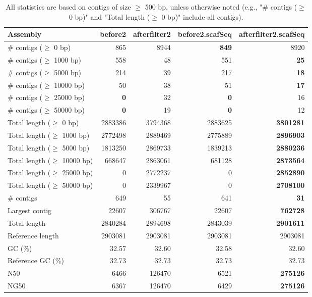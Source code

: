 \documentclass[12pt,a4paper]{article}
\begin{document}
\begin{table}[ht]
\begin{center}
\caption{All statistics are based on contigs of size $\geq$ 500 bp, unless otherwise noted (e.g., "\# contigs ($\geq$ 0 bp)" and "Total length ($\geq$ 0 bp)" include all contigs).}
\begin{tabular}{|l*{4}{|r}|}
\hline
Assembly & before2 & afterfilter2 & before2.scafSeq & afterfilter2.scafSeq \\ \hline
\# contigs ($\geq$ 0 bp) & 865 & 8944 & {\bf 849} & 8920 \\ \hline
\# contigs ($\geq$ 1000 bp) & 558 & 48 & 551 & {\bf 25} \\ \hline
\# contigs ($\geq$ 5000 bp) & 214 & 39 & 217 & {\bf 18} \\ \hline
\# contigs ($\geq$ 10000 bp) & 50 & 38 & 51 & {\bf 17} \\ \hline
\# contigs ($\geq$ 25000 bp) & {\bf 0} & 32 & {\bf 0} & 16 \\ \hline
\# contigs ($\geq$ 50000 bp) & {\bf 0} & 19 & {\bf 0} & 12 \\ \hline
Total length ($\geq$ 0 bp) & 2883386 & 3794368 & 2883625 & {\bf 3801281} \\ \hline
Total length ($\geq$ 1000 bp) & 2772498 & 2889469 & 2775889 & {\bf 2896903} \\ \hline
Total length ($\geq$ 5000 bp) & 1813250 & 2869733 & 1839213 & {\bf 2880236} \\ \hline
Total length ($\geq$ 10000 bp) & 668647 & 2863061 & 681128 & {\bf 2873564} \\ \hline
Total length ($\geq$ 25000 bp) & 0 & 2772237 & 0 & {\bf 2852890} \\ \hline
Total length ($\geq$ 50000 bp) & 0 & 2339967 & 0 & {\bf 2708100} \\ \hline
\# contigs & 649 & 55 & 641 & {\bf 31} \\ \hline
Largest contig & 22607 & 306767 & 22607 & {\bf 762728} \\ \hline
Total length & 2840284 & 2894698 & 2843039 & {\bf 2901611} \\ \hline
Reference length & 2903081 & 2903081 & 2903081 & 2903081 \\ \hline
GC (\%) & 32.57 & 32.60 & 32.58 & 32.60 \\ \hline
Reference GC (\%) & 32.73 & 32.73 & 32.73 & 32.73 \\ \hline
N50 & 6466 & 126470 & 6521 & {\bf 275126} \\ \hline
NG50 & 6367 & 126470 & 6429 & {\bf 275126} \\ \hline

\end{tabular}
\end{center}
\end{table}
\end{document}
